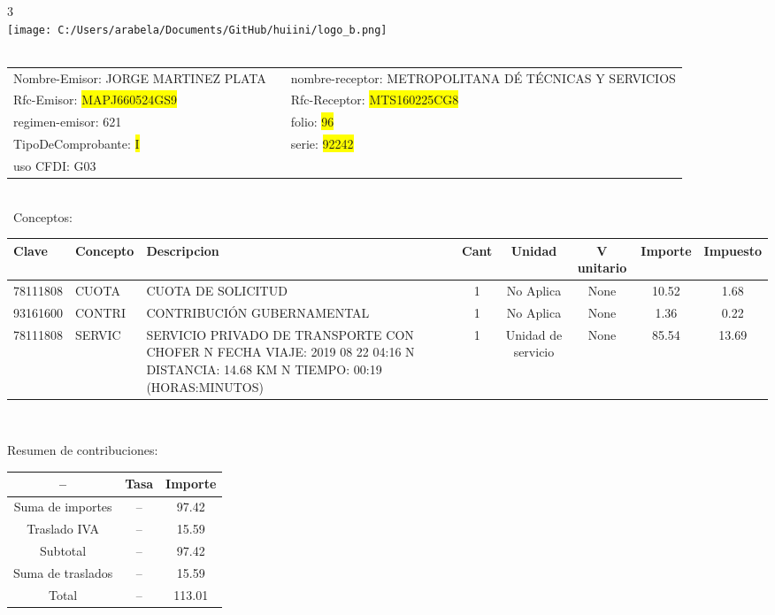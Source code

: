 \documentclass{article}
\begin{document}
\hspace{18cm} 3\\
\texttt{[image: C:/Users/arabela/Documents/GitHub/huiini/logo\_b.png]}
\bigskip\\\
\begin{tabular}{p{11cm}p{1cm}p{8cm}}

Nombre-Emisor: JORGE MARTINEZ PLATA && nombre-receptor: METROPOLITANA DÉ TÉCNICAS Y SERVICIOS\\

Rfc-Emisor: \colorbox{yellow}{ MAPJ660524GS9 } & & Rfc-Receptor: \colorbox{yellow}{ MTS160225CG8 }\\

regimen-emisor: 621 & & folio: \colorbox{yellow}{ 96 }\\

TipoDeComprobante: \colorbox{yellow}{ I } & & serie: \colorbox{yellow}{ 92242 }\\

uso CFDI: G03\\



\end{tabular}
\bigskip\bigskip\bigskip\\\
Conceptos:\\
\begin{tabular}{|p{1.5cm}|p{3.6cm}|p{3.6cm}|c|c|c|c|c|}
\hline
Clave & Concepto & Descripcion & Cant & Unidad & V unitario & Importe & Impuesto \\
\hline

78111808 & CUOTA  & CUOTA DE SOLICITUD & 1 & No Aplica & None & 10.52 &  1.68 \\
\hline

93161600 & CONTRI & CONTRIBUCIÓN GUBERNAMENTAL & 1 & No Aplica & None & 1.36 &  0.22 \\
\hline

78111808 & SERVIC & SERVICIO PRIVADO DE TRANSPORTE CON CHOFER  N FECHA VIAJE: 2019 08 22 04:16  N DISTANCIA: 14.68 KM  N TIEMPO: 00:19 (HORAS:MINUTOS) & 1 & Unidad de servicio & None & 85.54 &  13.69 \\
\hline

\end{tabular}\\
\bigskip
\begin{center}
Resumen de contribuciones:\\
\bigskip
\begin{tabular}{|c|c|c|}
\hline
 -- & Tasa & Importe\\
\hline

Suma de importes & -- & 97.42 \\
\hline

Traslado IVA & -- & 15.59 \\
\hline

Subtotal  & -- & 97.42 \\
\hline

Suma de traslados & -- & 15.59 \\
\hline

Total  & -- & 113.01 \\
\hline

\end{tabular}
\end{center}
\end{document}
